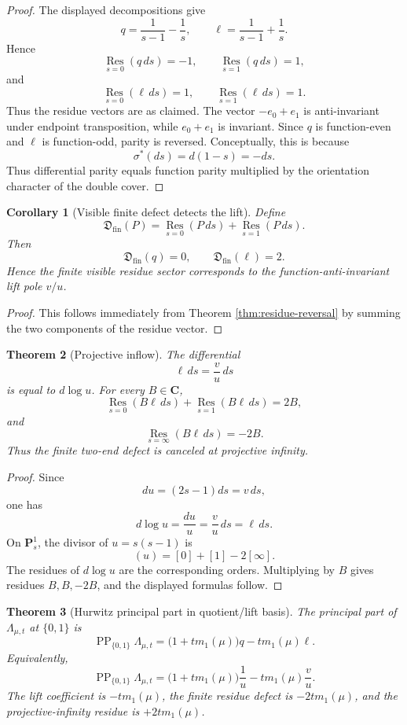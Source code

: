 \documentclass[11pt]{article}
\newcommand{\C}{\mathbf C}
\newcommand{\PP}{\operatorname{PP}}
\newcommand{\Res}{\operatorname*{Res}}
\theoremstyle{plain}
\newtheorem{theorem}{Theorem}[section]
\newtheorem{corollary}[theorem]{Corollary}
\theoremstyle{definition}
\begin{document}
\begin{proof}
The displayed decompositions give
\[
   q=\frac1{s-1}-\frac1s,
   \qquad
   \ell=\frac1{s-1}+\frac1s.
\]
Hence
\[
   \Res_{s=0}(q\,ds)=-1,
   \qquad
   \Res_{s=1}(q\,ds)=1,
\]
and
\[
   \Res_{s=0}(\ell\,ds)=1,
   \qquad
   \Res_{s=1}(\ell\,ds)=1.
\]
Thus the residue vectors are as claimed.  The vector \(-e_0+e_1\) is anti-invariant under endpoint transposition, while \(e_0+e_1\) is invariant.  Since \(q\) is function-even and \(\ell\) is function-odd, parity is reversed.  Conceptually, this is because
\[
   \sigma^*(ds)=d(1-s)=-ds.
\]
Thus differential parity equals function parity multiplied by the orientation character of the double cover.
\end{proof}

\begin{corollary}[Visible finite defect detects the lift]\label{cor:visible-detects-lift}
Define
\[
   \mathfrak D_{\operatorname{fin}}(P)=\Res_{s=0}(P\,ds)+\Res_{s=1}(P\,ds).
\]
Then
\[
   \mathfrak D_{\operatorname{fin}}(q)=0,
   \qquad
   \mathfrak D_{\operatorname{fin}}(\ell)=2.
\]
Hence the finite visible residue sector corresponds to the function-anti-invariant lift pole \(v/u\).
\end{corollary}

\begin{proof}
This follows immediately from Theorem \ref{thm:residue-reversal} by summing the two components of the residue vector.
\end{proof}

\begin{theorem}[Projective inflow]\label{thm:projective-inflow}
The differential
\[
   \ell\,ds=\frac vu\,ds
\]
is equal to \(d\log u\).  For every \(B\in\C\),
\[
   \Res_{s=0}(B\ell\,ds)+\Res_{s=1}(B\ell\,ds)=2B,
\]
and
\[
   \Res_{s=\infty}(B\ell\,ds)=-2B.
\]
Thus the finite two-end defect is canceled at projective infinity.
\end{theorem}

\begin{proof}
Since
\[
   du=(2s-1)ds=v\,ds,
\]
one has
\[
   d\log u=\frac{du}{u}=\frac vu\,ds=\ell\,ds.
\]
On \(\mathbf P^1_s\), the divisor of \(u=s(s-1)\) is
\[
   (u)=[0]+[1]-2[\infty].
\]
The residues of \(d\log u\) are the corresponding orders.  Multiplying by \(B\) gives residues \(B,B,-2B\), and the displayed formulas follow.
\end{proof}

\begin{theorem}[Hurwitz principal part in quotient/lift basis]\label{thm:hurwitz-pp}
The principal part of \(\Lambda_{\mu,t}\) at \(\{0,1\}\) is
\[
   \PP_{\{0,1\}}\Lambda_{\mu,t}
   =\bigl(1+t m_1(\mu)\bigr)q-tm_1(\mu)\ell.
\]
Equivalently,
\[
   \PP_{\{0,1\}}\Lambda_{\mu,t}
   =\bigl(1+t m_1(\mu)\bigr)\frac1u-tm_1(\mu)\frac vu.
\]
The lift coefficient is \(-t m_1(\mu)\), the finite residue defect is \(-2t m_1(\mu)\), and the projective-infinity residue is \(+2t m_1(\mu)\).
\end{theorem}
\end{document}
